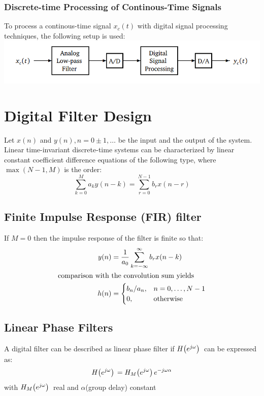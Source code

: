 \documentclass[accentcolor=tud4c,9.5pt,nochapname,bigchapter,paper=a5report]{tudreport}
\begin{document}
\subsection{Discrete-time Processing of Continous-Time Signals}
To process a continous-time signal $x_c(t)$ with digital signal processing techniques, the following setup is used:\\
\includegraphics[width=\textwidth]{images/dsp_setup.png}

\chapter{Digital Filter Design}

Let $x(n)$ and $y(n) , n=0\pm 1,\ldots$ be the input and the output of the system.  
Linear time-invariant discrete-time systems can be characterized 
 by linear constant coefficient difference equations of the following type, where $\max(N-1,M)$ is the order:
 \begin {equation}
 \sum\limits_{k=0}^{M}a_ky(n-k)= \sum\limits_{r=0}^{N-1} b_r x(n-r)
 \end{equation}
\section{Finite Impulse Response (FIR) filter}
If $M=0$ then the impulse response of the filter is finite so that:
\begin{subequations}
\begin{align}
y(n) &= \frac{1}{a_0}\sum\limits_{k=-\infty}^{\infty}b_r x(n-k) \\
\text{comparison with } &\text{the convolution sum yields} \notag \\
h(n) &= \begin{cases}
b_n/a_n, &n=0,\ldots,N-1\\
0, &\text{otherwise}
\end{cases}
\end{align}
\end{subequations}

\section{Linear Phase Filters}
A digital filter can be described as linear phase filter if $H{\left(e^{j\omega}\right)}\,$ can be expressed as:
\begin{equation}
	H{\left(e^{j\omega}\right)}\, = H_M{\left(e^{j\omega}\right)}\, e^{-j\omega \alpha}
\end{equation} 
with $H_M{\left(e^{j\omega}\right)}\,$ real and $\alpha$(group delay) constant 
\end{document}
